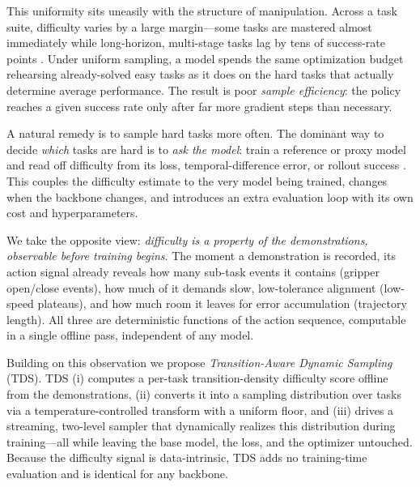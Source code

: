 \documentclass[letterpaper]{article} %
\newcommand{\tds}{TDS}
\begin{document}
This uniformity sits uneasily with the structure of manipulation. Across a task suite, difficulty varies by a large margin---some tasks are mastered almost immediately while long-horizon, multi-stage tasks lag by tens of success-rate points \citep{liu2023libero,kim2024openvla}. Under uniform sampling, a model spends the same optimization budget rehearsing already-solved easy tasks as it does on the hard tasks that actually determine average performance. The result is poor \emph{sample efficiency}: the policy reaches a given success rate only after far more gradient steps than necessary.

A natural remedy is to sample hard tasks more often. The dominant way to decide \emph{which} tasks are hard is to \emph{ask the model}: train a reference or proxy model and read off difficulty from its loss, temporal-difference error, or rollout success \citep{schaul2016prioritized,lin2017focal,hejna2024remix,xie2023doremi}. This couples the difficulty estimate to the very model being trained, changes when the backbone changes, and introduces an extra evaluation loop with its own cost and hyperparameters.

We take the opposite view: \emph{difficulty is a property of the demonstrations, observable before training begins}. The moment a demonstration is recorded, its action signal already reveals how many sub-task events it contains (gripper open/close events), how much of it demands slow, low-tolerance alignment (low-speed plateaus), and how much room it leaves for error accumulation (trajectory length). All three are deterministic functions of the action sequence, computable in a single offline pass, independent of any model.

Building on this observation we propose \emph{Transition-Aware Dynamic Sampling} (\tds{}). \tds{} (i) computes a per-task transition-density difficulty score offline from the demonstrations, (ii) converts it into a sampling distribution over tasks via a temperature-controlled transform with a uniform floor, and (iii) drives a streaming, two-level sampler that dynamically realizes this distribution during training---all while leaving the base model, the loss, and the optimizer untouched. Because the difficulty signal is data-intrinsic, \tds{} adds no training-time evaluation and is identical for any backbone.
\end{document}
